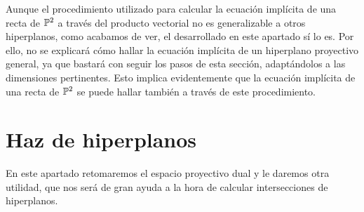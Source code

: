 \begin{obs}
	Aunque el procedimiento utilizado para calcular la ecuación implícita de una recta de $\mathbb{P}^2$ a través del producto vectorial no es generalizable a otros hiperplanos, como acabamos de ver, el desarrollado en este apartado sí lo es. Por ello, no se explicará cómo hallar la ecuación implícita de un hiperplano proyectivo general, ya que bastará con seguir los pasos de esta sección, adaptándolos a las dimensiones pertinentes. Esto implica evidentemente que la ecuación implícita de una recta de $\mathbb{P}^2$ se puede hallar también a través de este procedimiento.
\end{obs}

\section{Haz de hiperplanos}
En este apartado retomaremos el espacio proyectivo dual y le daremos otra utilidad, que nos será de gran ayuda a la hora de calcular intersecciones de hiperplanos.

